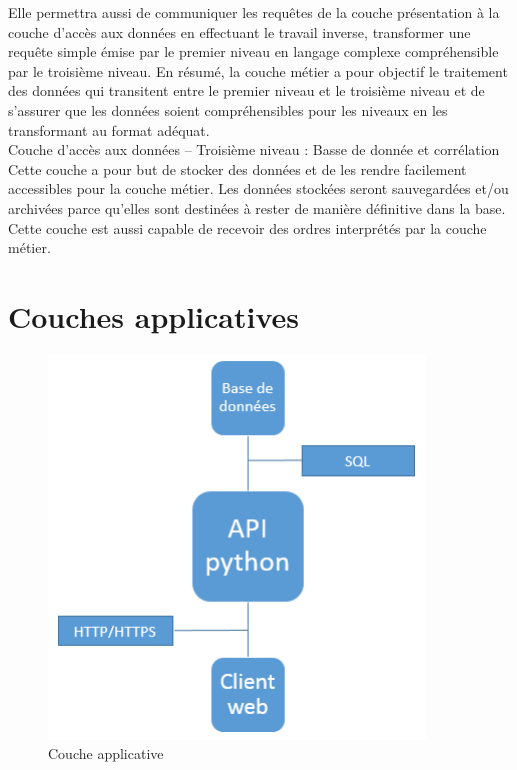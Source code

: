 Elle permettra aussi de communiquer les requêtes de la couche présentation à la couche d’accès aux données en effectuant le travail inverse, transformer une requête simple émise par le premier niveau en langage complexe compréhensible par le troisième niveau. En résumé, la couche métier a pour objectif le traitement des données qui transitent entre le premier niveau et le troisième niveau et de s’assurer que les données soient compréhensibles pour les niveaux en les transformant au format adéquat.\\
Couche d’accès aux données – Troisième niveau : Basse de donnée et corrélation
Cette couche a pour but de stocker des données et de les rendre facilement accessibles pour la couche métier.  Les données stockées seront sauvegardées et/ou archivées parce qu’elles sont destinées à rester de manière définitive dans la base. Cette couche est aussi capable de recevoir des ordres interprétés par la couche métier.\\
\section{Couches applicatives}

\begin{figure}[H]
  \caption{Couche applicative}
  \centering
  \vspace*{0.5cm}
  \includegraphics[width=10cm]{implem_3.png}
\end{figure}
